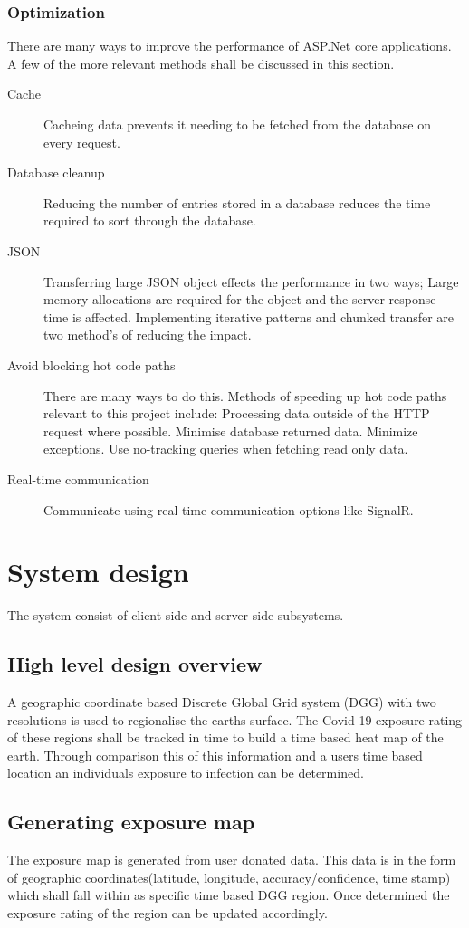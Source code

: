 \documentclass[a4paper,open right,12pt]{report}
\begin{document}
\subsection{Optimization}
There are many ways to improve the performance of ASP.Net core applications. A few of the more relevant methods shall be discussed in this section.\cite{PerformanceBestPractices}
\begin{description}
    \item[Cache] Cacheing data prevents it needing to be fetched from the database on every request.
    \item[Database cleanup] Reducing the number of entries stored in a database reduces the time required to sort through the database.
    \item[JSON] Transferring large JSON object effects the performance in two ways; Large memory allocations are required for the object and the server response time is affected. Implementing iterative patterns and chunked transfer are two method's of reducing the impact.\cite{JsonArrayStreaming}
    \item[Avoid blocking hot code paths] There are many ways to do this. Methods of speeding up hot code paths relevant to this project include: Processing data outside of the HTTP request where possible. Minimise database returned data. Minimize exceptions. Use no-tracking queries when fetching read only data.
    \item[Real-time communication] Communicate using real-time communication options like SignalR.
\end{description}

\newpage
\chapter{System design}
The system consist of client side and server side subsystems.

\section{High level design overview}
A geographic coordinate based Discrete Global Grid system (DGG) with two resolutions is used to regionalise the earths surface. The Covid-19 exposure rating of these regions shall be tracked in time to build a time based heat map of the earth. Through comparison this of this information and a users time based location an individuals exposure to infection can be determined.

\section{Generating exposure map}
The exposure map is generated from user donated data. This data is in the form of geographic coordinates(latitude, longitude, accuracy/confidence, time stamp) which shall fall within as specific time based DGG region. Once determined the exposure rating of the region can be updated accordingly.
\end{document}
